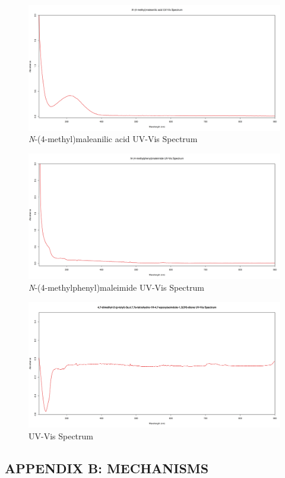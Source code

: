 \documentclass[11pt]{article}
\begin{document}
\begin{figure}[H]
    \centering
    \includegraphics[scale=0.33]{spectra/uvvis10.1.png}
    \caption{\textit{N}-(4-methyl)maleanilic acid UV-Vis Spectrum}
\end{figure}
\begin{figure}[H]
    \centering
    \includegraphics[scale=0.33]{spectra/uvvis10.2.png}
    \caption{\textit{N}-(4-methylphenyl)maleimide UV-Vis Spectrum}
\end{figure}
\begin{figure}[H]
    \centering
    \includegraphics[scale=0.33]{spectra/uvvis10.3.png}
    \caption{ UV-Vis Spectrum}
\end{figure}

\newpage
\subsection*{APPENDIX B: MECHANISMS}
\end{document}
